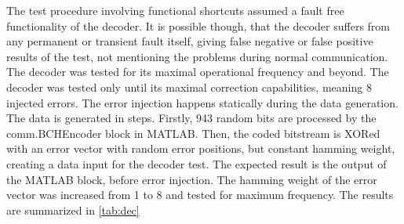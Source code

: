 The test procedure involving functional shortcuts assumed a fault free functionality of the decoder. It is possible though, that the decoder suffers from any permanent or transient fault itself, giving false negative or false positive results of the test, not mentioning the problems during normal communication. The decoder was tested for its maximal operational frequency and beyond. The decoder was tested only until its maximal correction capabilities, meaning 8 injected errors. The error injection happens statically during the data generation. The data is generated in steps. Firstly, 943 random bits are processed by the comm.BCHEncoder block in MATLAB. Then, the coded bitstream is XORed with an error vector with random error positions, but constant hamming weight, creating a data input for the decoder test. The expected result is the output of the MATLAB block, before error injection. The hamming weight of the error vector was increased from 1 to 8 and tested for maximum frequency. The results are summarized in \autoref{tab:dec}
